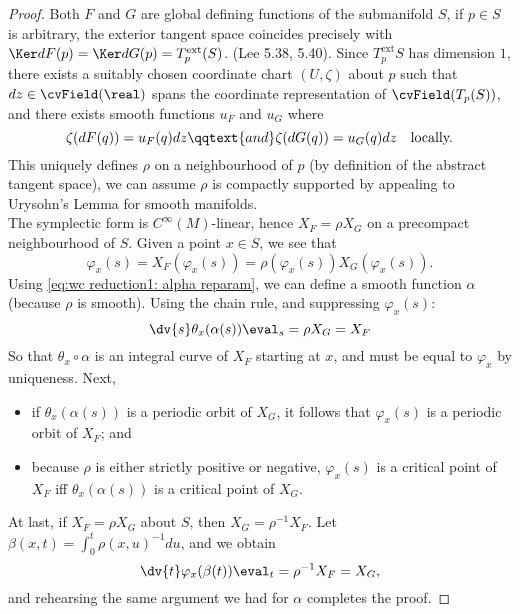 \documentclass[../main-v2-manifolds.tex]{subfiles}
\begin{document}
\begin{proof}
    Both $F$ and $G$ are global defining functions of the submanifold $S$, if $p\in S$ is arbitrary, the exterior tangent space coincides precisely with $\Ker dF(p) = \Ker dG(p) = T^{\mathrm{ext}}_{p}(S)$. (Lee 5.38, 5.40). Since $T^{\mathrm{ext}}_{p}S$ has dimension $1$, there exists a suitably chosen coordinate chart $(U, \zeta)$ about $p$ such that $dz\in\cvField(\real)$ spans the coordinate representation of $\cvField(T_p(S))$, and there exists smooth functions $u_F$ and $u_G$ where
    \[
        \zeta(dF(q)) = u_F(q)dz\qqtext{and}\zeta(dG(q)) = u_G(q)dz\quad\text{locally.}
    \]
    This uniquely defines $\rho$ on a neighbourhood of $p$ (by definition of the abstract tangent space), we can assume $\rho$ is compactly supported by appealing to Urysohn's Lemma for smooth manifolds.\\

    The symplectic form is $C^\infty(M)$-linear, hence $X_F = \rho X_G$ on a precompact neighbourhood of $S$. Given a point $x\in S$, we see that
    \[
        \varphi_x(s) = X_F(\varphi_x(s)) = \rho(\varphi_x(s)) X_G(\varphi_x(s)).
    \]
    Using \cref{eq:wc reduction1: alpha reparam}, we can define a smooth function $\alpha$ (because $\rho$ is smooth). Using the chain rule, and suppressing $\varphi_{x}(s)$:
    \[
        \dv{s} \theta_{x}(\alpha(s))\eval_s = \rho X_G = X_F
    \]
    So that $\theta_{x}\circ \alpha$ is an integral curve of $X_F$ starting at $x$, and must be equal to $\varphi_{x}$ by uniqueness. Next, 
    \begin{itemize}
        \item if $\theta_{x}(\alpha(s))$ is a periodic orbit of $X_G$, it follows that $\varphi_x(s)$ is a periodic orbit of $X_F$; and
        \item because $\rho$ is either strictly positive or negative, $\varphi_{x}(s)$ is a critical point of $X_F$ iff $\theta_{x}(\alpha(s))$ is a critical point of $X_G$.
    \end{itemize}
    At last, if $X_F = \rho X_G$ about $S$, then $X_G = \rho^{-1} X_F$. Let $\beta(x,t) = \int_0^t \rho(x,u)^{-1}du$, and we obtain
    \[
        \dv{t}\varphi_{x}(\beta(t))\eval_t = \rho^{-1}X_F = X_G,
    \]
    and rehearsing the same argument we had for $\alpha$ completes the proof.
\end{proof}
\end{document}
